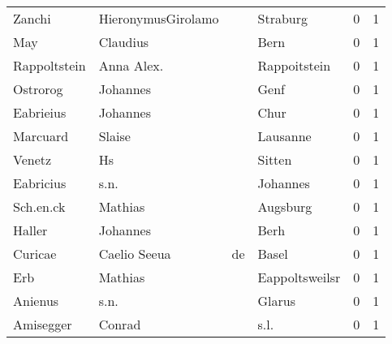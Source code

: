 \documentclass[10pt,a4paper,landscape]{article}
\begin{document}
\begin{longtable}{llllrr}
                   Zanchi &                 HieronymusGirolamo &             &                                    Straburg &          0 &         1 \\
                      May &                           Claudius &             &                                        Bern &          0 &         1 \\
             Rappoltstein &                         Anna Alex. &             &                                Rappoitstein &          0 &         1 \\
                 Ostrorog &                           Johannes &             &                                        Genf &          0 &         1 \\
                Eabrieius &                           Johannes &             &                                        Chur &          0 &         1 \\
                 Marcuard &                             Slaise &             &                                    Lausanne &          0 &         1 \\
                   Venetz &                                 Hs &             &                                      Sitten &          0 &         1 \\
                Eabricius &                               s.n. &             &                                    Johannes &          0 &         1 \\
                Sch.en.ck &                            Mathias &             &                                    Augsburg &          0 &         1 \\
                   Haller &                           Johannes &             &                                        Berh &          0 &         1 \\
                  Curicae &                       Caelio Seeua &          de &                                       Basel &          0 &         1 \\
                      Erb &                            Mathias &             &                              Eappoltsweilsr &          0 &         1 \\
                  Anienus &                               s.n. &             &                                      Glarus &          0 &         1 \\
                Amisegger &                             Conrad &             &                                        s.l. &          0 &         1 \\

\end{longtable}
\end{document}
